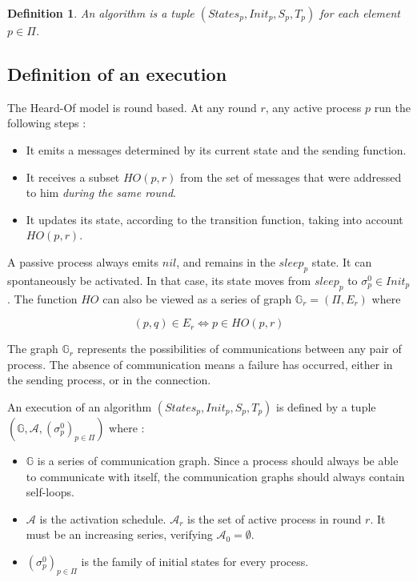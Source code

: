 \documentclass{article}
\newtheorem{definition}{Definition}
\begin{document}
\begin{definition}
	An algorithm is a tuple $(States_p, Init_p, S_p, T_p)$ for each element $p \in \Pi$.
\end{definition}


\subsection{Definition of an execution}

The Heard-Of model is round based. At any round $r$, any active process $p$ run the following steps :

\begin{itemize}
	\item It emits a messages determined by its current state and the sending function.
	\item It receives a subset $HO(p,r)$ from the set of messages that were addressed to him
		\textit{during the same round}.
	\item It updates its state, according to the transition function, taking into account $HO(p,r)$.
\end{itemize}

A passive process always emits $nil$, and remains in the $sleep_p$ state.
It can spontaneously be activated. In that case, its state moves from $sleep_p$ to $\sigma^0_p \in Init_p$.
The function $HO$ can also be viewed as a series of graph $\mathds{G}_r = (\Pi, E_r)$ where

$$(p, q) \in E_r \Leftrightarrow p \in HO(p, r)$$

The graph $\mathds{G}_r$ represents the possibilities of communications between any pair of process.
The absence of communication means a failure has occurred, either in the sending process, or in the connection.

An execution of an algorithm $(States_p, Init_p, S_p, T_p)$ is defined by a tuple
$(\mathds{G}, \mathcal{A}, (\sigma^0_p)_{p \in \Pi})$ where :

\begin{itemize}
	\item $\mathds{G}$ is a series of communication graph. Since a process should always be able to communicate 
		with itself, the communication graphs should always contain self-loops.
	\item $\mathcal{A}$ is the activation schedule. $\mathcal{A}_r$ is the set of active process in round $r$.
		It must be an increasing series, verifying $\mathcal{A}_0 = \emptyset$.
	\item $(\sigma^0_p)_{p \in \Pi}$ is the family of initial states for every process.
\end{itemize}
\end{document}
